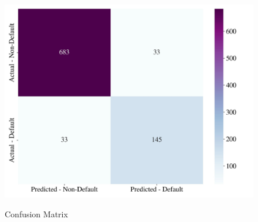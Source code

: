         \begin{figure}[H]
            \centering
            \caption{Confusion Matrix}\vspace{0.5em}
            \label{fig:confmat}\
            \includegraphics[width=130mm]{Figures/Confusion_Matrix.jpg}
            \vspace{-1em}
        \end{figure}
        
